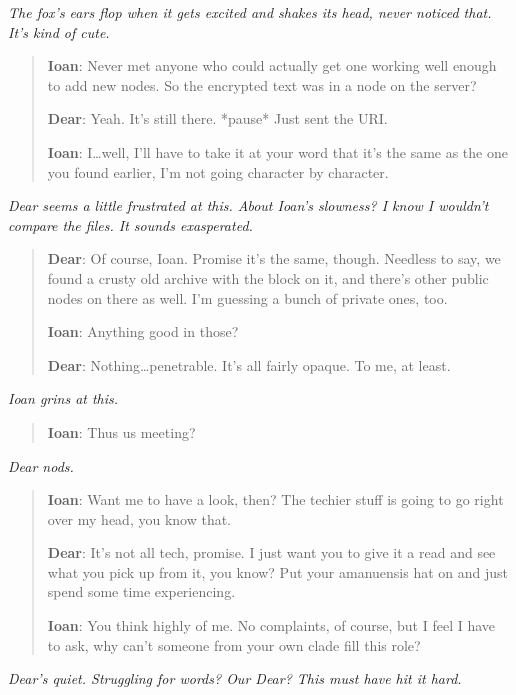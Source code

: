 \emph{The fox's ears flop when it gets excited and shakes its head, never noticed that. It's kind of cute.}

\begin{quote}
\textbf{Ioan}: Never met anyone who could actually get one working well enough to add new nodes. So the encrypted text was in a node on the server?

\textbf{Dear}: Yeah. It's still there. *pause* Just sent the URI.

\textbf{Ioan}: I\ldots{}well, I'll have to take it at your word that it's the same as the one you found earlier, I'm not going character by character.
\end{quote}

\emph{Dear seems a little frustrated at this. About Ioan's slowness? I know I wouldn't compare the files. It sounds exasperated.}

\begin{quote}
\textbf{Dear}: Of course, Ioan. Promise it's the same, though. Needless to say, we found a crusty old archive with the block on it, and there's other public nodes on there as well. I'm guessing a bunch of private ones, too.

\textbf{Ioan}: Anything good in those?

\textbf{Dear}: Nothing\ldots{}penetrable. It's all fairly opaque. To me, at least.
\end{quote}

\emph{Ioan grins at this.}

\begin{quote}
\textbf{Ioan}: Thus us meeting?
\end{quote}

\emph{Dear nods.}

\begin{quote}
\textbf{Ioan}: Want me to have a look, then? The techier stuff is going to go right over my head, you know that.

\textbf{Dear}: It's not all tech, promise. I just want you to give it a read and see what you pick up from it, you know? Put your amanuensis hat on and just spend some time experiencing.

\textbf{Ioan}: You think highly of me. No complaints, of course, but I feel I have to ask, why can't someone from your own clade fill this role?
\end{quote}

\emph{Dear's quiet. Struggling for words? Our Dear? This must have hit it hard.}

